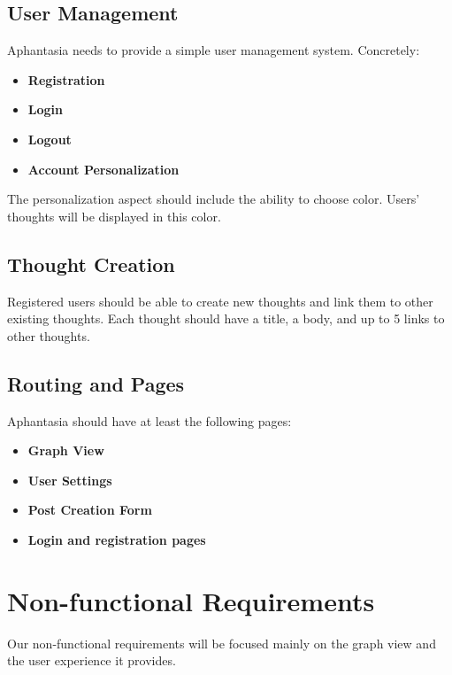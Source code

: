 \subsection{User Management}
Aphantasia needs to provide a simple user management system.
Concretely:
\begin{itemize}
  \item \textbf{Registration}
  \item \textbf{Login}
  \item \textbf{Logout}
  \item \textbf{Account Personalization}
\end{itemize}
The personalization aspect should include the ability to choose color. Users' thoughts will be displayed in this color.

\subsection{Thought Creation}
Registered users should be able to create new thoughts and link them to other existing thoughts.
Each thought should have a title, a body, and up to 5 links to other thoughts.


\subsection{Routing and Pages}
Aphantasia should have at least the following pages:
\begin{itemize}
  \item \textbf{Graph View}
  \item \textbf{User Settings}
  \item \textbf{Post Creation Form}
  \item \textbf{Login and registration pages}
\end{itemize}

\section{Non-functional Requirements}
Our non-functional requirements will be focused mainly on the graph view and the user experience it provides.

